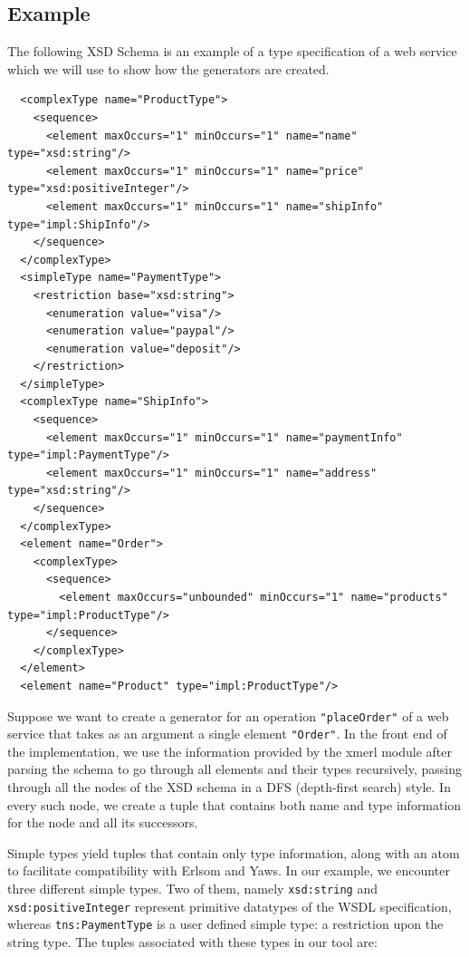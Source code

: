 \documentclass[submission,copyright]{eptcs}
\begin{document}
\subsection{Example}

The following XSD Schema is an example of a type specification of a web service 
which we will use to show how the generators are created.

\begin{lstlisting}
  <complexType name="ProductType">
    <sequence>
      <element maxOccurs="1" minOccurs="1" name="name" type="xsd:string"/>
      <element maxOccurs="1" minOccurs="1" name="price" type="xsd:positiveInteger"/>
      <element maxOccurs="1" minOccurs="1" name="shipInfo" type="impl:ShipInfo"/>
    </sequence>
  </complexType>
  <simpleType name="PaymentType">
    <restriction base="xsd:string">
      <enumeration value="visa"/>
      <enumeration value="paypal"/>
      <enumeration value="deposit"/>
    </restriction>
  </simpleType>
  <complexType name="ShipInfo">
    <sequence>
      <element maxOccurs="1" minOccurs="1" name="paymentInfo" type="impl:PaymentType"/>
      <element maxOccurs="1" minOccurs="1" name="address" type="xsd:string"/>
    </sequence>
  </complexType>
  <element name="Order">
    <complexType>
      <sequence>
        <element maxOccurs="unbounded" minOccurs="1" name="products" type="impl:ProductType"/>
      </sequence>
    </complexType>
  </element>
  <element name="Product" type="impl:ProductType"/>
\end{lstlisting}


Suppose we want to create a generator for an operation \texttt{"placeOrder"} of a 
web service that takes as an argument a single element \texttt{"Order"}. In the 
front end of the implementation, we use the information provided by the xmerl 
module after parsing the schema to go through all elements and their types recursively, 
passing through all the nodes of the XSD schema in a DFS (depth-first search) style. In every such node, 
we create a tuple that contains both name and type information for the node and 
all its successors. 

Simple types yield tuples that contain only type information, along with an atom 
to facilitate compatibility with Erlsom and Yaws. In our example, we encounter 
three different simple types. Two of them, namely \texttt{xsd:string} and
\texttt{xsd:positiveInteger} represent primitive datatypes of the WSDL specification,
whereas \texttt{tns:PaymentType} is a user defined simple type: a restriction
upon the string type. The tuples associated with these types in our tool are:
\end{document}
